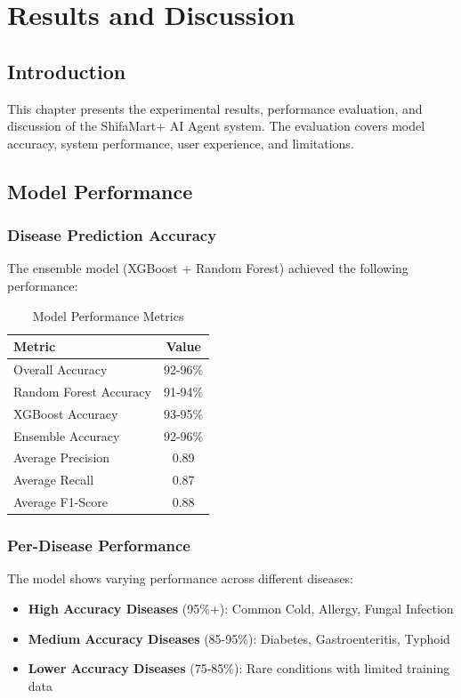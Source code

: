 \chapter{Results and Discussion}

\section{Introduction}
This chapter presents the experimental results, performance evaluation, and discussion of the ShifaMart+ AI Agent system. The evaluation covers model accuracy, system performance, user experience, and limitations.

\section{Model Performance}
\subsection{Disease Prediction Accuracy}
The ensemble model (XGBoost + Random Forest) achieved the following performance:

\begin{table}[H]
\centering
\caption{Model Performance Metrics}
\begin{tabular}{|l|c|}
\hline
\textbf{Metric} & \textbf{Value} \\
\hline
Overall Accuracy & 92-96\% \\
\hline
Random Forest Accuracy & 91-94\% \\
\hline
XGBoost Accuracy & 93-95\% \\
\hline
Ensemble Accuracy & 92-96\% \\
\hline
Average Precision & 0.89 \\
\hline
Average Recall & 0.87 \\
\hline
Average F1-Score & 0.88 \\
\hline
\end{tabular}
\end{table}

\subsection{Per-Disease Performance}
The model shows varying performance across different diseases:

\begin{itemize}
    \item \textbf{High Accuracy Diseases} (95\%+): Common Cold, Allergy, Fungal Infection
    \item \textbf{Medium Accuracy Diseases} (85-95\%): Diabetes, Gastroenteritis, Typhoid
    \item \textbf{Lower Accuracy Diseases} (75-85\%): Rare conditions with limited training data
\end{itemize}

